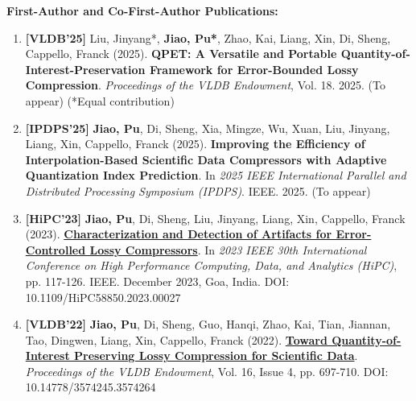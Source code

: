 \documentclass[a4paper,11pt]{article}
\begin{document}
\textbf{First-Author and Co-First-Author Publications:}
\small{
\begin{enumerate}[leftmargin=*, labelsep=0.5em]
\item \textbf{[VLDB'25]} Liu, Jinyang*, \textbf{Jiao, Pu*}, Zhao, Kai, Liang, Xin, Di, Sheng, Cappello, Franck (2025). \textbf{QPET: A Versatile and Portable Quantity-of-Interest-Preservation Framework for Error-Bounded Lossy Compression}. \textit{Proceedings of the VLDB Endowment}, Vol. 18. 2025. (To appear) (*Equal contribution)

\item \textbf{[IPDPS'25]} \textbf{Jiao, Pu}, Di, Sheng, Xia, Mingze, Wu, Xuan, Liu, Jinyang, Liang, Xin, Cappello, Franck (2025). \textbf{Improving the Efficiency of Interpolation-Based Scientific Data Compressors with Adaptive Quantization Index Prediction}. In \textit{2025 IEEE International Parallel and Distributed Processing Symposium (IPDPS)}. IEEE. 2025. (To appear)

\item \textbf{[HiPC'23]} \textbf{Jiao, Pu}, Di, Sheng, Liu, Jinyang, Liang, Xin, Cappello, Franck (2023). \href{https://doi.org/10.1109/HiPC58850.2023.00027}{\textbf{Characterization and Detection of Artifacts for Error-Controlled Lossy Compressors}}. In \textit{2023 IEEE 30th International Conference on High Performance Computing, Data, and Analytics (HiPC)}, pp. 117-126. IEEE. December 2023, Goa, India. DOI: 10.1109/HiPC58850.2023.00027

\item \textbf{[VLDB'22]} \textbf{Jiao, Pu}, Di, Sheng, Guo, Hanqi, Zhao, Kai, Tian, Jiannan, Tao, Dingwen, Liang, Xin, Cappello, Franck (2022). \href{https://doi.org/10.14778/3574245.3574264}{\textbf{Toward Quantity-of-Interest Preserving Lossy Compression for Scientific Data}}. \textit{Proceedings of the VLDB Endowment}, Vol. 16, Issue 4, pp. 697-710. DOI: 10.14778/3574245.3574264
\end{enumerate}
}
\end{document}
